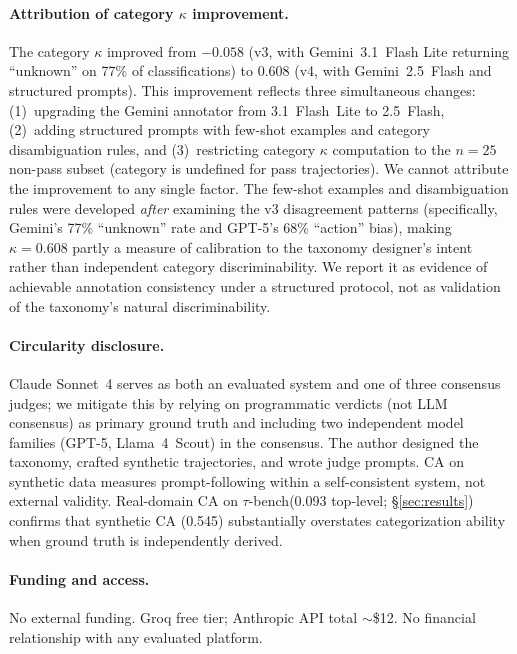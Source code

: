 \documentclass[11pt]{article}
\newcommand{\taubench}{$\tau$-bench\xspace}
\begin{document}
\paragraph{Attribution of category $\kappa$ improvement.}
The category $\kappa$ improved from $-0.058$ (v3, with Gemini~3.1~Flash
Lite returning ``unknown'' on 77\% of classifications) to 0.608 (v4,
with Gemini~2.5~Flash and structured prompts). This improvement reflects
three simultaneous changes: (1)~upgrading the Gemini annotator from
3.1~Flash~Lite to 2.5~Flash, (2)~adding structured prompts with
few-shot examples and category disambiguation rules, and (3)~restricting
category $\kappa$ computation to the $n = 25$ non-pass subset (category
is undefined for pass trajectories). We cannot attribute the improvement
to any single factor. The few-shot examples and disambiguation rules
were developed \emph{after} examining the v3 disagreement patterns
(specifically, Gemini's 77\% ``unknown'' rate and GPT-5's 68\%
``action'' bias), making $\kappa = 0.608$ partly a measure of
calibration to the taxonomy designer's intent rather than independent
category discriminability. We report it as evidence of achievable
annotation consistency under a structured protocol, not as validation
of the taxonomy's natural discriminability.

\paragraph{Circularity disclosure.}
Claude Sonnet~4 serves as both an evaluated system and one of three
consensus judges; we mitigate this by relying on programmatic verdicts
(not LLM consensus) as primary ground truth and including two independent
model families (GPT-5, Llama~4~Scout) in the consensus.
The author designed the taxonomy, crafted synthetic trajectories, and
wrote judge prompts. CA on synthetic data measures prompt-following
within a self-consistent system, not external validity. Real-domain CA
on \taubench (0.093 top-level; \S\ref{sec:results}) confirms that
synthetic CA (0.545) substantially overstates categorization ability
when ground truth is independently derived.

\paragraph{Funding and access.}
No external funding. Groq free tier; Anthropic API total $\sim$\$12. No
financial relationship with any evaluated platform.

\end{document}
